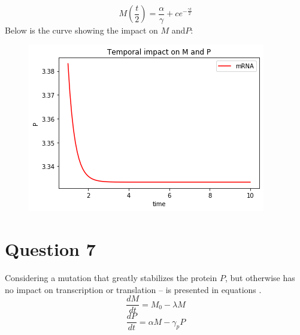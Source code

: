 \documentclass[12pt,a4paper]{article}
\begin{document}
\begin{equation}
 M\left(  \frac{t}{2} \right) = \frac{\alpha}{\gamma} + ce^{- \frac{\gamma t}{2}}
 \label{eq:7}
\end{equation}
Below is the curve showing the impact on $M$ and$ P$:
\begin{figure}[H]
\centering
\includegraphics[scale=0.5]{./gaphics/q_6.png}
\caption{ }
\end{figure}
\section*{Question 7}
Considering a mutation that greatly stabilizes the protein $P$,  but otherwise has no impact on
transcription or translation – is presented in equations .
\begin{equation}
\frac{dM}{dt} =  M_0 -  \lambda M 
\label{eq:8}
\end{equation}
\begin{equation}
\frac{dP}{dt} =  \alpha M - \gamma_p P
\label{eq:9}
\end{equation}
\end{document}
